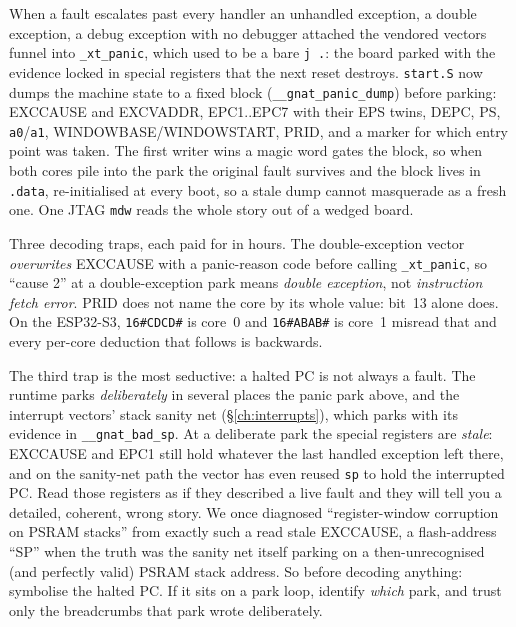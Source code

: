 When a fault escalates past every handler \textemdash{} an unhandled
exception, a double exception, a debug exception with no debugger attached
\textemdash{} the vendored vectors funnel into \texttt{\_xt\_panic}, which
used to be a bare \texttt{j .}: the board parked with the evidence locked in
special registers that the next reset destroys.  \texttt{start.S} now dumps
the machine state to a fixed block (\texttt{\_\_gnat\_panic\_dump}) before
parking: EXCCAUSE and EXCVADDR, EPC1..EPC7 with their EPS twins, DEPC, PS,
\texttt{a0}/\texttt{a1}, WINDOWBASE/WINDOWSTART, PRID, and a marker for which
entry point was taken.  The first writer wins \textemdash{} a magic word gates
the block, so when both cores pile into the park the original fault survives
\textemdash{} and the block lives in \texttt{.data}, re-initialised at every
boot, so a stale dump cannot masquerade as a fresh one.  One JTAG
\texttt{mdw} reads the whole story out of a wedged board.

Three decoding traps, each paid for in hours.  The double-exception vector
\emph{overwrites} EXCCAUSE with a panic-reason code before calling
\texttt{\_xt\_panic}, so ``cause 2'' at a double-exception park means
\emph{double exception}, not \emph{instruction fetch error}.  PRID does
not name the core by its whole value: bit~13 alone does.  On the ESP32-S3,
\texttt{16\#CDCD\#} is core~0 and \texttt{16\#ABAB\#} is core~1
\textemdash{} misread that and every per-core deduction that follows is
backwards.

The third trap is the most seductive: a halted PC is not always a fault.  The
runtime parks \emph{deliberately} in several places \textemdash{} the panic
park above, and the interrupt vectors' stack sanity net
(\S\ref{ch:interrupts}), which parks with its evidence in
\texttt{\_\_gnat\_bad\_sp}.  At a deliberate park the
special registers are \emph{stale}: EXCCAUSE and EPC1 still hold whatever the
last handled exception left there, and on the sanity-net path the vector has
even reused \texttt{sp} to hold the interrupted PC.  Read those registers as
if they described a live fault and they will tell you a detailed, coherent,
wrong story.  We once diagnosed ``register-window corruption on PSRAM
stacks'' from exactly such a read \textemdash{} stale EXCCAUSE, a
flash-address ``SP'' \textemdash{} when the truth was the sanity net itself
parking on a then-unrecognised (and perfectly valid) PSRAM stack address.  So
before decoding anything: symbolise the halted PC.  If it sits on a park loop,
identify \emph{which} park, and trust only the breadcrumbs that park wrote
deliberately.

